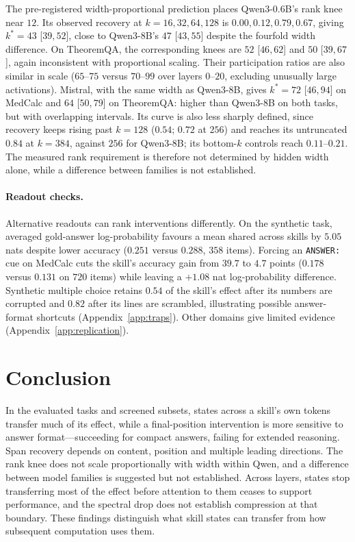 \documentclass{article}
\begin{document}
The pre-registered width-proportional prediction places Qwen3-0.6B's rank
knee near $12$. Its observed recovery at $k=16,32,64,128$ is
$0.00,0.12,0.79,0.67$, giving $k^{*}=43$ [$39,52$], close to Qwen3-8B's
$47$ [$43,55$] despite the fourfold width difference. On TheoremQA, the
corresponding knees are $52$ [$46,62$] and $50$ [$39,67$], again inconsistent
with proportional scaling. Their participation ratios are also similar in
scale ($65$--$75$ versus $70$--$99$ over layers $0$--$20$, excluding unusually
large activations). Mistral, with the same width as Qwen3-8B, gives
$k^{*}=72$ [$46,94$] on MedCalc and $64$ [$50,79$] on TheoremQA: higher than
Qwen3-8B on both tasks, but with overlapping intervals. Its curve is also less
sharply defined, since recovery keeps rising past $k=128$ ($0.54$; $0.72$ at
$256$) and reaches its untruncated $0.84$ at $k=384$, against $256$ for
Qwen3-8B; its bottom-$k$ controls reach
$0.11$--$0.21$. The measured rank requirement is therefore not determined by
hidden width alone, while a difference between families is not established.

\paragraph{Readout checks.}
\label{sec:traps}
Alternative readouts can rank interventions differently. On the synthetic task,
averaged gold-answer log-probability favours a mean shared across skills by
$5.05$ nats despite lower accuracy ($0.251$ versus $0.288$, $358$ items).
Forcing an \texttt{ANSWER:} cue on MedCalc cuts the skill's accuracy gain from
$39.7$ to $4.7$ points ($0.178$ versus $0.131$ on $720$ items) while leaving a
$+1.08$ nat log-probability difference. Synthetic multiple
choice retains $0.54$ of the skill's effect after its numbers are corrupted and
$0.82$ after its lines are scrambled, illustrating possible answer-format
shortcuts
\citep{balepur2024artifacts} (Appendix~\ref{app:traps}). Other domains give limited evidence
(Appendix~\ref{app:replication}).

\section{Conclusion}

In the evaluated tasks and screened subsets, states across a skill's own
tokens transfer much of its effect, while a final-position intervention is more
sensitive to answer format---succeeding for compact answers, failing for
extended reasoning. Span recovery depends on content, position and multiple
leading directions. The rank knee does not scale proportionally with width
within Qwen, and a difference between model families is suggested but not
established. Across layers, states stop transferring most of the effect before
attention to them ceases to support performance, and the spectral drop does not
establish compression at that boundary. These findings distinguish what skill
states can transfer from how subsequent computation uses them.
\end{document}
